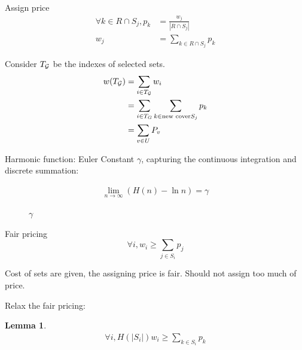 \documentclass[a4paper]{report}
\theoremstyle{definition}
\newtheorem{lem}{Lemma}[section]
\begin{document}
Assign price 
\begin{align*}
\forall k \in R \cap S_j, p_k &= \frac{w_j}{|R\cap S_j|}\\
w_j &= \sum_{k\in R\cap S_j}p_k
\end{align*}

Consider $T_{\mathcal{G}}$ be the indexes of selected sets. 
\begin{align*}
w(T_{\mathcal{G}}) &= \sum_{i\in T_{\mathcal{G}}} w_i \\
&= \sum_{i\in T_G}\sum_{k\in \text{new cover} S_j} p_k \\
&= \sum_{v\in U} P_v
\end{align*}

Harmonic function: Euler Constant $\gamma$, capturing the continuous integration and discrete summation:

\begin{align*}
\lim_{n\to\infty}\left(H(n) - \ln n\right) = \gamma 
\end{align*}

\begin{figure}[!htp]
\centering
{}
\caption{$\gamma$}
\label{fig:gammaArea}
\end{figure}

Fair pricing
$$
\forall i, w_i \geq \sum_{j\in S_i} p_j
$$

Cost of sets are given, the assigning price is fair. Should not assign too much of price. 

Relax the fair pricing: 

\begin{lem}
\begin{align*}
\forall i, H(|S_i|) w_i \geq \sum_{k\in S_i} p_k
\end{align*}
\end{lem}
\end{document}
